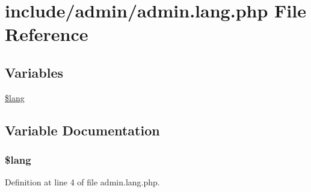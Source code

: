 \hypertarget{admin_8lang_8php}{\section{include/admin/admin.lang.\+php File Reference}
\label{admin_8lang_8php}
}
\subsection*{Variables}
\begin{DoxyCompactItemize}
\item 
\hyperlink{admin_8lang_8php_a7714b111b644017933931ec69a154102}{\$lang}
\end{DoxyCompactItemize}


\subsection{Variable Documentation}
\hypertarget{admin_8lang_8php_a7714b111b644017933931ec69a154102}{
\subsubsection[{\$lang}]{\setlength{\rightskip}{0pt plus 5cm}\$lang}}\label{admin_8lang_8php_a7714b111b644017933931ec69a154102}


Definition at line 4 of file admin.\+lang.\+php.

